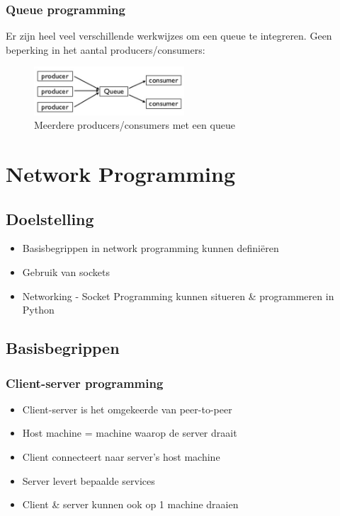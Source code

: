 \documentclass{article}
\begin{document}
\subsubsection{Queue programming}

Er zijn heel veel verschillende werkwijzes om een queue te integreren.
Geen beperking in het aantal producers/consumers:

\begin{figure}[H]
    \centering
    \includegraphics[width=0.5\textwidth]{queue-producers-consumers.png}
    \caption{Meerdere producers/consumers met een queue}
\end{figure}

\section{Network Programming}

\subsection{Doelstelling}

\begin{itemize}
    \item Basisbegrippen in network programming kunnen definiëren
    \item Gebruik van sockets
    \item Networking - Socket Programming kunnen situeren \& programmeren in Python
\end{itemize}

\subsection{Basisbegrippen}

\subsubsection{Client-server programming}

\begin{itemize}
    \item Client-server is het omgekeerde van peer-to-peer
    \item Host machine = machine waarop de server draait
    \item Client connecteert naar server's host machine
    \item Server levert bepaalde services   
    \item Client \& server kunnen ook op 1 machine draaien
\end{itemize}
\end{document}
